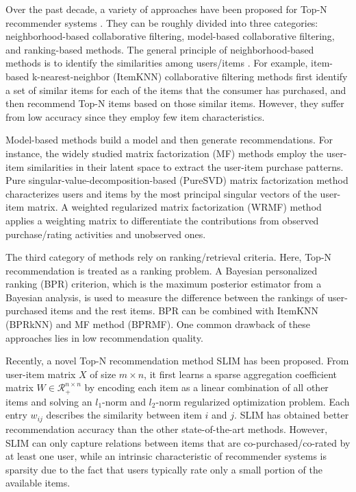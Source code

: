 \documentclass[letterpaper]{article}
\begin{document}
Over the past decade, a variety of approaches have been proposed for Top-N recommender systems \cite{ricci2011introduction}. They can be roughly divided into three categories: %
neighborhood-based collaborative filtering, model-based collaborative filtering, and ranking-based methods. The general principle of neighborhood-based methods is to identify the similarities among users/items \cite{deshpande2004item}. For example, item-based k-nearest-neighbor (ItemKNN) collaborative filtering methods first identify a set of similar items for each of the items that the consumer has purchased, and then recommend Top-N items based on those similar items. However, they suffer from low accuracy since they employ few item characteristics.

Model-based methods build a model and then generate recommendations. For instance, the widely studied matrix factorization (MF) methods employ the user-item similarities in their latent space to extract the user-item purchase patterns. Pure singular-value-decomposition-based (PureSVD) matrix factorization method \cite{cremonesi2010performance} characterizes users and items by the most principal singular vectors of the user-item matrix. A weighted regularized matrix factorization (WRMF) \cite{pan2008one,hu2008collaborative} method applies a weighting matrix to differentiate the contributions from observed purchase/rating activities and unobserved ones.%

The third category of methods rely on ranking/retrieval criteria. Here, Top-N recommendation is treated as a ranking problem. A Bayesian personalized ranking (BPR) \cite{rendle2009bpr} criterion, which is the maximum posterior estimator from a Bayesian analysis, is used to measure the difference between the rankings of user-purchased items and the rest items. BPR can be combined with ItemKNN (BPRkNN) and MF method (BPRMF). One common drawback of these approaches lies in low recommendation quality.

Recently, a novel Top-N recommendation method SLIM \cite{ning2011slim} has been proposed. From user-item matrix $X$ of size $m\times n$, it first learns a sparse aggregation coefficient matrix $W\in\mathcal{R}_{+}^{n\times n}$ by encoding each item as a linear combination of all other items and solving an $l_1$-norm and $l_2$-norm regularized optimization problem. Each entry $w_{ij}$ describes the similarity between item $i$ and $j$. SLIM has obtained better recommendation accuracy than the other state-of-the-art methods. However, SLIM can only capture relations between items that are co-purchased/co-rated by at least one user, while an intrinsic characteristic of recommender systems is sparsity due to the fact that users typically rate only a small portion of the available items.
\end{document}
